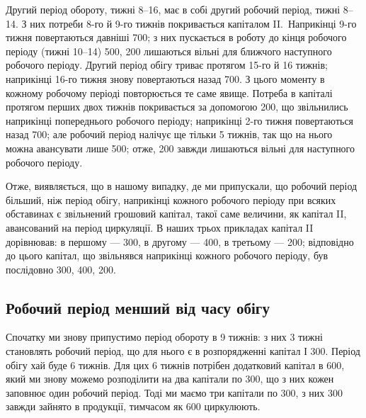 
Другий період обороту, тижні 8--16, має в собі другий робочий
період, тижні 8--14. З них потреби 8-го й 9-го тижнів покривається
капіталом II.~Наприкінці 9-го тижня повертаються давніші 700;
з них пускається в роботу до кінця робочого періоду (тижні 10--14)
500, 200 лишаються вільні для ближчого наступного
робочого періоду. Другий період обігу триває протягом 15-го й 16 тижнів;
наприкінці 16-го тижня знову повертаються назад 700.
З цього моменту в кожному робочому періоді повторюється те саме
явище. Потреба в капіталі протягом перших двох тижнів покривається
за допомогою 200, що звільнились наприкінці попереднього
робочого періоду; наприкінці 2-го тижня повертаються назад 700; але робочий період налічує ще тільки 5 тижнів, так що на нього
можна авансувати лише 500; отже, 200 завжди лишаються
вільні для наступного робочого періоду.

Отже, виявляється, що в нашому випадку, де ми припускали, що робочий
період більший, ніж період обігу, наприкінці кожного робочого
періоду при всяких обставинах є звільнений грошовий капітал, такої
саме величини, як капітал II, авансований на період циркуляції. В наших
трьох прикладах капітал II дорівнював: в першому — 300, в
другому — 400, в третьому — 200; відповідно до
цього капітал, що звільнявся наприкінці кожного робочого періоду, був
послідовно 300, 400, 200.

\subsection{Робочий період менший від часу обігу}

Спочатку ми знову припустимо період обороту в 9 тижнів: з них
3 тижні становлять робочий період, що для нього є в розпорядженні
капітал  І \deq{} 300. Період обігу хай буде 6 тижнів. Для цих
6 тижнів потрібен додатковий капітал в 600, який ми знову
можемо розподілити на два капітали по 300, що з них кожен
заповнює один робочий період. Тоді ми маємо три капітали по 300, з них 300 завжди зайнято в продукції, тимчасом як
600 циркулюють.

